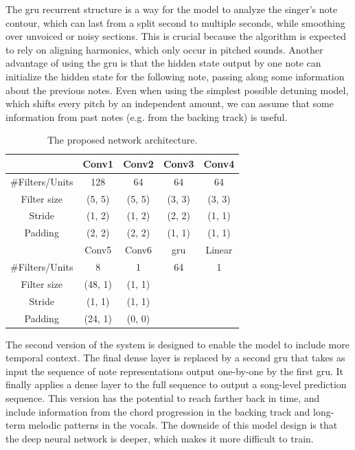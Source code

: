 The \gls{gru} recurrent structure is a way for the model to analyze the singer's note contour, which can last from a split second to multiple seconds, while smoothing over unvoiced or noisy sections. This is crucial because the algorithm is expected to rely on aligning harmonics, which only occur in pitched sounds. Another advantage of using the \gls{gru} is that the hidden state output by one note can initialize the hidden state for the following note, passing along some information about the previous notes. Even when using the simplest possible detuning model, which shifts every pitch by an independent amount, we can assume that some information from past notes (e.g. from the backing track) is useful.

\begin{table}[t]
  \begin{center}
    \caption{The proposed network architecture.}
    \begin{tabular}{|c||c|c|c|c|}
    \hline
      & Conv1 & Conv2 & Conv3 & Conv4 \\
      \hline
      \#Filters/Units & 128 & 64 & 64 & 64 \\
      Filter size & (5, 5) & (5, 5) & (3, 3) & (3, 3) \\
      Stride & (1, 2) & (1, 2) & (2, 2) & (1, 1) \\
      Padding & (2, 2) & (2, 2) & (1, 1) & (1, 1) \\
      \hline
      & Conv5 & Conv6 & \gls{gru} & Linear \\
      \hline
      \#Filters/Units & 8 & 1 & 64 & 1 \\
      Filter size & (48, 1) & (1, 1) & & \\
      Stride & (1, 1) & (1, 1) & & \\
      Padding & (24, 1) & (0, 0) & & \\
      \hline
    \end{tabular}
    \vspace{-.1in}
    \label{tab:network}
  \end{center}
\end{table}

The second version of the system is designed to enable the model to include more temporal context. The final dense layer is replaced by a second \gls{gru} that takes as input the sequence of note representations output one-by-one by the first \gls{gru}. It finally applies a dense layer to the full sequence to output a song-level prediction sequence. This version has the potential to reach farther back in time, and include information from the chord progression in the backing track and long-term melodic patterns in the vocals. The downside of this model design is that the deep neural network is deeper, which makes it more difficult to train. 

